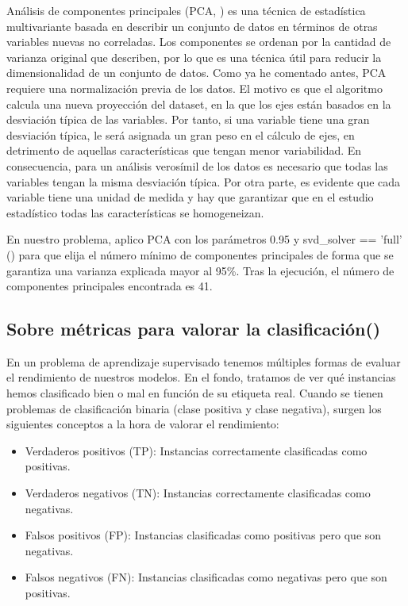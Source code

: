 Análisis de componentes principales (PCA, \cite{pca}) es una técnica de estadística multivariante basada en describir un conjunto de datos en términos de otras variables nuevas no correladas. Los componentes se ordenan por la cantidad de varianza original que describen, por lo que es una técnica útil para reducir la dimensionalidad de un conjunto de datos. Como ya he comentado antes, PCA requiere una normalización previa de los datos. El motivo es que el algoritmo calcula una nueva proyección del dataset, en la que los ejes están basados en la desviación típica de las variables. Por tanto, si una variable tiene una gran desviación típica, le será asignada un gran peso en el cálculo de ejes, en detrimento de aquellas características que tengan menor variabilidad. En consecuencia, para un análisis verosímil de los datos es necesario que todas las variables tengan la misma desviación típica. Por otra parte, es evidente que cada variable tiene una unidad de medida y hay que garantizar que en el estudio estadístico todas las características se homogeneizan. 

En nuestro problema, aplico PCA con los parámetros 0.95 y svd\_solver == 'full' (\cite{pca-sk}) para que elija el número mínimo de componentes principales de forma que se garantiza una varianza explicada mayor al 95\%. Tras la ejecución, el número de componentes principales encontrada es 41.

\subsection{Sobre métricas para valorar la clasificación(\cite{seleccion-metricas})}

En un problema de aprendizaje supervisado tenemos múltiples formas de evaluar el rendimiento de nuestros modelos. En el fondo, tratamos de ver qué instancias hemos clasificado bien o mal en función de su etiqueta real. Cuando se tienen problemas de clasificación binaria (clase positiva y clase negativa), surgen los siguientes conceptos a la hora de valorar el rendimiento:

\begin{itemize}
	\item Verdaderos positivos (TP): Instancias correctamente clasificadas como positivas.
	\item Verdaderos negativos (TN): Instancias correctamente clasificadas como negativas.
	\item Falsos positivos (FP): Instancias clasificadas como positivas pero que son negativas.
	\item Falsos negativos (FN): Instancias clasificadas como negativas pero que son positivas.
\end{itemize}

